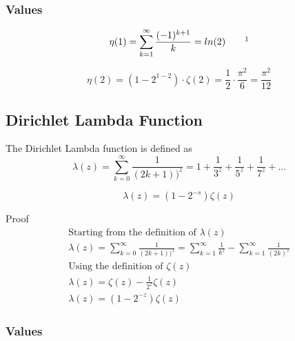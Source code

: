 \documentclass[a4paper]{article}
\begin{document}
\subsubsection{Values}
\begin{equation}
\eta(1) = \sum_{k=1}^{\infty} \frac{(-1)^{k+1}}{k} = ln(2) \quad \quad \footnotemark 
\end{equation}

\begin{equation} 
\eta(2) = (1 - 2^{1-2}) \cdot \zeta(2) =
\frac{1}{2} \cdot \frac{\pi^2}{6} = \frac{\pi^2}{12} 
\end{equation}


\pagebreak

\subsection{Dirichlet Lambda Function}

\begin{definition}\label{Dirichlet Lambda Function def}
The Dirichlet Lambda function is defined as 
$$
\lambda(z) = \sum_{k=0}^{\infty} \frac{1}{(2k +1))^z} = 1 + \frac{1}{3^z} +  \frac{1}{5^z} +  \frac{1}{7^z} + ...
$$
\end{definition}

\begin{theorem}
\begin{equation}
\boxed{
\lambda(z) = (1 - 2^{-s}) \zeta(z)
}
\end{equation}

Proof
\\
\begin{gather*}
\text{Starting from the definition of $\lambda(z)$}
\\
\lambda(z) 
=
\sum_{k=0}^{\infty} \frac{1}{(2k +1))^z}
=
\sum_{k=1}^{\infty} \frac{1}{k^z} - \sum_{k=1}^{\infty} \frac{1}{(2k)^z}
\\
\text{Using the definition of $\zeta(z)$}
\\
\lambda(z) 
=
\zeta(z) - \frac{1}{2^{z}} \zeta(z)
\\
\lambda(z) = (1 - 2^{-z}) \zeta(z)
\end{gather*}
\end{theorem}

\subsubsection{Values}
\end{document}
